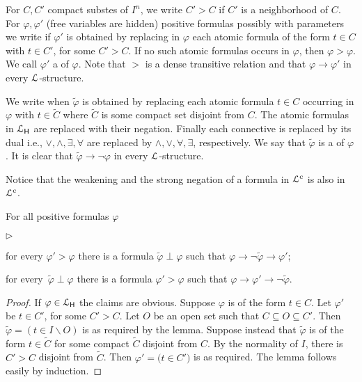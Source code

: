 \documentclass{amsproc}
\newcommand{\mylabel}[1]{{#1}\hfill}
\renewenvironment{itemize}
  {\begin{list}{$\triangleright$}{%
  \setlength{\parskip}{0mm}
  \setlength{\topsep}{.4\baselineskip}
  \setlength{\rightmargin}{0mm}
  \setlength{\listparindent}{0mm}
  \setlength{\itemindent}{0mm}
  \setlength{\labelwidth}{3ex}
  \setlength{\itemsep}{.2\baselineskip}
  \setlength{\parsep}{.2\baselineskip}
  \setlength{\partopsep}{0mm}
  \setlength{\labelsep}{1ex}
  \setlength{\leftmargin}{\labelwidth+\labelsep}
  \let\makelabel\mylabel}}{%
\end{list}}
\renewcommand*{\emph}[1]{%
   \smash{\tikz[baseline]\node[rectangle, fill=teal!25, rounded corners, inner xsep=0.5ex, inner ysep=0.2ex, anchor=base, minimum height = 2.7ex]{\strut #1};}}
\begin{document}
For $C,C'$ compact substes of $I^n$, we write $C'>C$ if $C'$ is a neighborhood of $C$.
For $\varphi,\varphi'$ (free variables are hidden) positive formulas possibly with parameters we write \emph{$\varphi'>\varphi$\/} if $\varphi'$ is obtained by replacing in $\varphi$ each atomic formula of the form $t\in C$ with $t\in C'$, for some $C'>C$.
If no such atomic formulas occurs in $\varphi$, then $\varphi>\varphi$.
We call $\varphi'$ a \emph{weakening\/} of $\varphi$.
Note that $>$ is a dense transitive relation and that  $\varphi\to\varphi'$ in every ${\EuScript L}$-structure.

We write \emph{$\tilde\varphi\perp\varphi$\/} when $\tilde\varphi$ is obtained by replacing each atomic formula $t\in C$ occurring in $\varphi$ with $t\in\tilde{C}$ where $\tilde{C}$ is some compact set disjoint from $C$.
The atomic formulas in ${\EuScript L}_{\sf H}$ are replaced with their negation.
Finally each connective is replaced by its dual i.e., $\vee, \wedge, \exists,\forall$ are replaced by $\wedge,\vee,\forall,\exists$, respectively.
We say that  $\tilde\varphi$ is a \emph{strong negation} of $\varphi$.
It is clear that $\tilde\varphi\rightarrow\neg\varphi$ in every ${\EuScript L}$-structure.

Notice that the weakening and the strong negation of a formula in ${\EuScript L}^{\rm c}$ is also in ${\EuScript L}^{\rm c}$.

\begin{lemma}\label{lem_interpolation}
  For all positive formulas $\varphi$
  \begin{itemize}
    \item[1.]for every $\varphi'>\varphi$ there is a formula $\tilde\varphi\perp\varphi$ such that $\varphi\rightarrow\neg \tilde\varphi\rightarrow\varphi'$;
    \item[2.] for every\, $\tilde\varphi\perp\varphi$ there is a formula $\varphi'>\varphi$ such that  $\varphi\rightarrow\varphi'\rightarrow\neg \tilde\varphi$.
  \end{itemize}
\end{lemma}

\begin{proof}
  If $\varphi\in {\EuScript L}_{\sf H}$ the claims are obvious.
  Suppose $\varphi$ is of the form $t\in C$.
  Let $\varphi'$ be $t\in C'$, for some $C'>C$.
  Let $O$ be an open set such that $C\subseteq O\subseteq C'$.
  Then $\tilde\varphi=(t\in I\smallsetminus O)$ is as required by the lemma.
  Suppose instead that $\tilde\varphi$ is of the form $t\in\tilde{C}$ for some compact $\tilde{C}$ disjoint from $C$.
  By the normality of $I$, there is  $C'>C$ disjoint from $\tilde{C}$.
  Then  $\varphi'=\big(t\in C'\big)$ is as required.
  The lemma follows easily by induction.
\end{proof}
\end{document}
